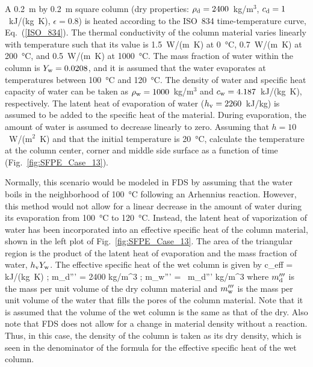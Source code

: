 \documentclass[11pt]{book}
\begin{document}
A 0.2~m by 0.2~m square column (dry properties: $\rho_{\rm d}=2400$~kg/m$^3$, $c_{\rm d}=1$~kJ/(kg~K), $\epsilon=0.8$) is heated according to the ISO~834 time-temperature curve, Eq.~(\ref{ISO_834}). The thermal conductivity of the column material varies linearly with temperature such that its value is 1.5~W/(m~K) at 0~°C, 0.7~W/(m~K) at 200~°C, and 0.5~W/(m~K) at 1000~°C. The mass fraction of water within the column is $Y_{\rm w}=0.0208$, and it is assumed that the water evaporates at temperatures between 100~°C and 120~°C. The density of water and specific heat capacity of water can be taken as $\rho_{\rm w}=1000$~kg/m$^3$ and $c_{\rm w}=4.187$~kJ/(kg~K), respectively. The latent heat of evaporation of water ($h_{\rm v}=2260$~kJ/kg) is assumed to be added to the specific heat of the material. During evaporation, the amount of water is assumed to decrease linearly to zero. Assuming that $h=10$~W/(m$^2$~K) and that the initial temperature is 20~°C, calculate the temperature at the column center, corner and middle side surface as a function of time (Fig.~\ref{fig:SFPE_Case_13}).

Normally, this scenario would be modeled in FDS by assuming that the water boils in the neighborhood of 100~\unit{\degreeCelsius} following an Arhennius reaction. However, this method would not allow for a linear decrease in the amount of water during its evaporation from 100~\unit{\degreeCelsius} to 120~\unit{\degreeCelsius}. Instead, the latent heat of vaporization of water has been incorporated into an effective specific heat of the column material, shown in the left plot of Fig.~\ref{fig:SFPE_Case_13}. The area of the triangular region is the product of the latent heat of evaporation and the mass fraction of water, $h_{\rm v} Y_{\rm w}$. The effective specific heat of the wet column is given by
\be
   c_{\rm eff} =   \; \hbox{kJ/(kg K)} \quad ; \quad m_{\rm d}''' = 2400 \; \hbox{kg/m}^3 \quad ; \quad m_{\rm w}''' =  \,  m_{\rm d}'''   \hbox{kg/m}^3
\ee
where $m_{\rm d}'''$ is the mass per unit volume of the dry column material and $m_{\rm w}'''$ is the mass per unit volume of the water that fills the pores of the column material. Note that it is assumed that the volume of the wet column is the same as that of the dry. Also note that FDS does not allow for a change in material density without a reaction. Thus, in this case, the density of the column is taken as its dry density, which is seen in the denominator of the formula for the effective specific heat of the wet column.
\end{document}
